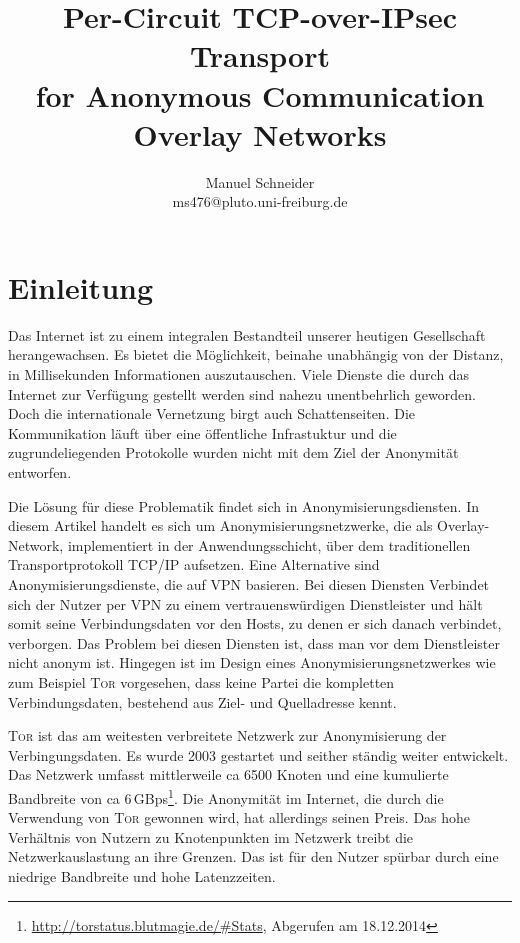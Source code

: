 \documentclass[fleqn,envcountsame,runningheads,10pt,a4paper]{llncs}
\begin{document}
\title{Per-Circuit TCP-over-IPsec Transport \\ for Anonymous Communication Overlay Networks} 
\author{Manuel Schneider \\ ms476@pluto.uni-freiburg.de}
\maketitle
\section{Einleitung}
\label{sec:intro}

Das Internet ist zu einem integralen Bestandteil unserer heutigen Gesellschaft herangewachsen. Es bietet die Möglichkeit, beinahe unabhängig von der Distanz, in Millisekunden Informationen auszutauschen. Viele Dienste die durch das Internet zur Verfügung gestellt werden sind nahezu unentbehrlich geworden. Doch die internationale Vernetzung birgt auch Schattenseiten. Die Kommunikation läuft über eine öffentliche Infrastuktur und die zugrundeliegenden Protokolle wurden nicht mit dem Ziel der Anonymität entworfen.

Die Lösung für diese Problematik findet sich in Anonymisierungsdiensten. In diesem Artikel handelt es sich um Anonymisierungsnetzwerke, die als Overlay-Network, implementiert in der Anwendungsschicht, über dem traditionellen Transportprotokoll TCP/IP aufsetzen. Eine Alternative sind Anonymisierungsdienste, die auf VPN basieren. Bei diesen Diensten Verbindet sich der Nutzer per VPN zu einem vertrauenswürdigen Dienstleister und hält somit seine Verbindungsdaten vor den Hosts, zu denen er sich danach verbindet, verborgen. Das Problem bei diesen Diensten ist, dass man vor dem Dienstleister nicht anonym ist. Hingegen ist im Design eines Anonymisierungsnetzwerkes wie zum Beispiel \textsc{Tor} vorgesehen, dass keine Partei die kompletten Verbindungsdaten, bestehend aus Ziel- und Quelladresse kennt.

\textsc{Tor} ist das am weitesten verbreitete Netzwerk zur Anonymisierung der Verbingungsdaten. Es wurde 2003 gestartet und seither ständig weiter entwickelt. Das Netzwerk umfasst mittlerweile ca 6500 Knoten und eine kumulierte Bandbreite von ca 6\,GBps\footnote{\url{http://torstatus.blutmagie.de/\#Stats}, Abgerufen am 18.12.2014}.  Die Anonymität im Internet, die durch die Verwendung von \textsc{Tor} gewonnen wird, hat allerdings seinen Preis. Das hohe Verhältnis von Nutzern zu Knotenpunkten im Netzwerk treibt die Netzwerkauslastung an ihre Grenzen. Das ist für den Nutzer spürbar durch eine niedrige Bandbreite und hohe Latenzzeiten.
\end{document}
